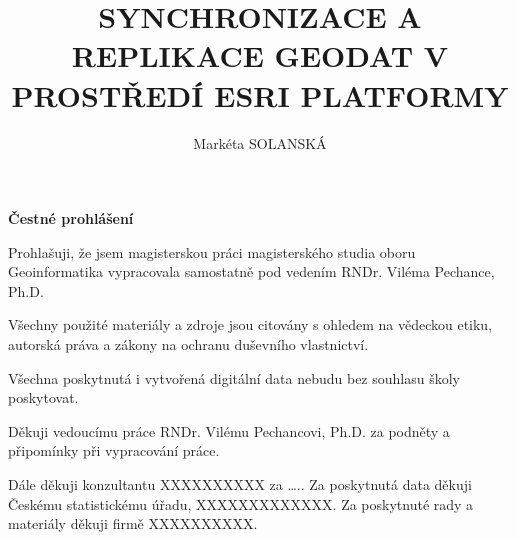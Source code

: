 \documentclass{thesisKGI}
\title{SYNCHRONIZACE A REPLIKACE GEODAT V PROSTŘEDÍ ESRI PLATFORMY}
\author{Markéta SOLANSKÁ}
\begin{document}
    \sloppy       %
    \maketitle    %


    \begin{declaration}
      \textbf{Čestné prohlášení}

      Prohlašuji, že jsem magisterskou práci magisterského studia oboru Geoinformatika vypracovala samostatně pod vedením RNDr. Viléma Pechance, Ph.D.

      Všechny použité materiály a zdroje jsou citovány s ohledem na vědeckou etiku, autorská práva a zákony na ochranu duševního vlastnictví.

      Všechna poskytnutá i vytvořená digitální data nebudu bez souhlasu školy poskytovat.
    \end{declaration}

    
    \begin{dedication}
      Děkuji vedoucímu práce RNDr. Vilému Pechancovi, Ph.D. za podněty a připomínky při vypracování práce.

      Dále děkuji konzultantu XXXXXXXXXX za …..
      Za poskytnutá data děkuji Českému statistickému úřadu, XXXXXXXXXXXXX.
      Za poskytnuté rady a materiály děkuji firmě XXXXXXXXXX.
      \vspace{4em}
    \end{dedication}

    
    \setcounter{page}{5}          %
    \makeGlossary                 %
\end{document}
